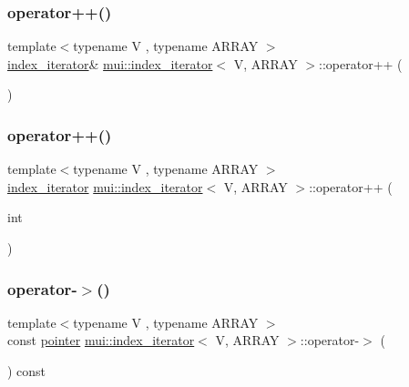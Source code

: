 \subsubsection{\texorpdfstring{operator++()}{operator++()}\hspace{0.1cm}{\footnotesize\ttfamily [1/2]}}
{\footnotesize\ttfamily template$<$typename V , typename A\+R\+R\+AY $>$ \\
\hyperlink{structmui_1_1index__iterator}{index\+\_\+iterator}\& \hyperlink{structmui_1_1index__iterator}{mui\+::index\+\_\+iterator}$<$ V, A\+R\+R\+AY $>$\+::operator++ (\begin{DoxyParamCaption}{ }\end{DoxyParamCaption})\hspace{0.3cm}{\ttfamily [inline]}}

\mbox{\label{structmui_1_1index__iterator_a7d8d2fecca6cf02b42a6de076cc766ea}} 
\subsubsection{\texorpdfstring{operator++()}{operator++()}\hspace{0.1cm}{\footnotesize\ttfamily [2/2]}}
{\footnotesize\ttfamily template$<$typename V , typename A\+R\+R\+AY $>$ \\
\hyperlink{structmui_1_1index__iterator}{index\+\_\+iterator} \hyperlink{structmui_1_1index__iterator}{mui\+::index\+\_\+iterator}$<$ V, A\+R\+R\+AY $>$\+::operator++ (\begin{DoxyParamCaption}\item[{int}]{ }\end{DoxyParamCaption})\hspace{0.3cm}{\ttfamily [inline]}}

\mbox{\label{structmui_1_1index__iterator_abe41aeb655f2be324323b8b445652abc}} 
\subsubsection{\texorpdfstring{operator-\/$>$()}{operator->()}\hspace{0.1cm}{\footnotesize\ttfamily [1/2]}}
{\footnotesize\ttfamily template$<$typename V , typename A\+R\+R\+AY $>$ \\
const \hyperlink{structmui_1_1index__iterator_afbdc05d0a9403f2fb4002373c06dce97}{pointer} \hyperlink{structmui_1_1index__iterator}{mui\+::index\+\_\+iterator}$<$ V, A\+R\+R\+AY $>$\+::operator-\/$>$ (\begin{DoxyParamCaption}{ }\end{DoxyParamCaption}) const\hspace{0.3cm}{\ttfamily [inline]}}


